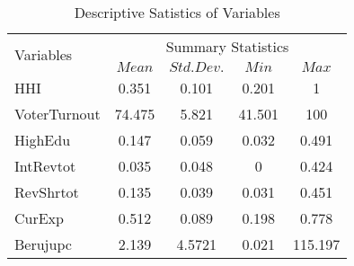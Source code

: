 \begin{table}[H]
  \centering
   \begin{tabular}{lcccc}
    \hline
    \multirow{2}{*}{Variables} &\multicolumn{4}{c}{Summary Statistics}\\&{$Mean$} & {$Std. Dev.$}  & {$Min$} & {$Max$} \\
        \hline
    HHI & 0.351 &0.101&  0.201  & 1\\
    VoterTurnout & 74.475 &5.821 &  41.501&100 \\
    HighEdu & 0.147 & 0.059& 0.032& 0.491\\
    IntRevtot &0.035 &0.048 &0 &0.424\\
    RevShrtot & 0.135 &0.039& 0.031  & 0.451\\
    CurExp & 0.512& 0.089& 0.198   & 0.778\\
    Berujupc & 2.139& 4.5721& 0.021  & 115.197\\
    \hline
    \end{tabular}
    \caption{Descriptive Satistics of Variables }  
     \label{Descriptive Statistics of Variables }
\end{table} 
